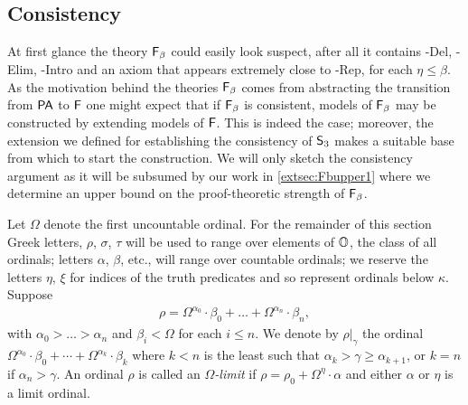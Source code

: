 \documentclass[UKenglish,cleveref,DIV=12]{scrartcl}
\theoremstyle{definition}
\theoremstyle{definition}
\begin{document}
\subsection{Consistency}\label{extsec:Fbconsis}
At first glance the theory $\mathsf{F}_\beta$ could easily look suspect, after all it
contains \textT\eta-Del, \textT\eta-Elim, \textT\eta-Intro and an axiom that appears
extremely close to \textT\eta-Rep, for each $\eta\le\beta$.
As the motivation behind the
theories $\mathsf{F}_\beta$ comes from abstracting the transition from $\mathsf{PA}$ to
$\mathsf{F}$ one might expect that if $\mathsf{F}_\beta$ is consistent, models of $\mathsf{F}_\beta$
may be constructed by extending models
of $\mathsf{F}$. This is indeed the case; moreover, the extension we defined for
establishing the consistency of $\mathsf{S}_3$ makes a suitable base from which to start the construction. We will only sketch the consistency argument as it will be subsumed
by our work in \cref{extsec:Fbupper1} where we determine an upper bound on the
proof-theoretic strength of $\mathsf{F}_\beta$.

Let $\Omega$ denote the first uncountable ordinal. For the remainder of this
section Greek letters, $\rho$, $\sigma$, $\tau$ will be used to range over
elements of $\mathbb{O}$, the class of all ordinals; letters $\alpha$, $\beta$, etc., will
range over countable ordinals; we reserve the letters $\eta$, $\xi$ for
indices of the truth predicates and so represent ordinals below $\kappa$.
Suppose
\begin{align*}
  \rho=\Omega^{\alpha_0}\cdot\beta_0+\dots+\Omega^{\alpha_n}\cdot\beta_n,
\end{align*}
 with $\alpha_0>\dots>\alpha_n$ and $\beta_i<\Omega$ for each $i\le n$. We denote by $\rho|_\gamma$ the ordinal
$\Omega^{\alpha_0}\cdot\beta_0+\cdots+\Omega^{\alpha_k}\cdot\beta_k$ where $k<n$
is the least such that $\alpha_k>\gamma\ge\alpha_{k+1}$, or $k=n$ if
$\alpha_n>\gamma$. An ordinal $\rho$ is called an {\em $\Omega$-limit} if $\rho=\rho_0+\Omega^\eta\cdot\alpha$ and either $\alpha$ or $\eta$ is a
limit ordinal.
\end{document}
